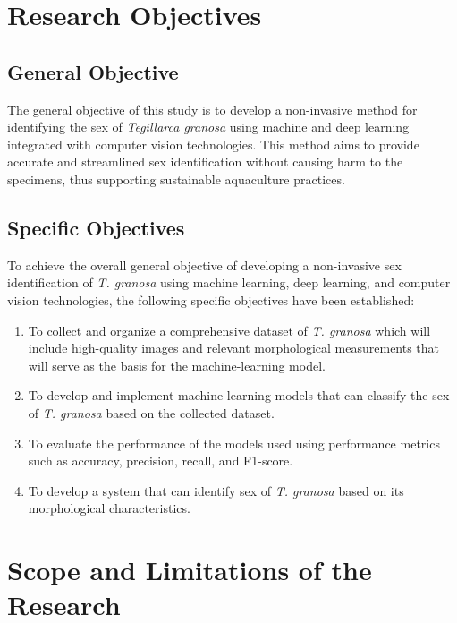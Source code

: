 \section{Research Objectives}
\label{sec:researchobjectives}

\subsection{General Objective}
\label{sec:generalobjective}

The general objective of this study is to develop a non-invasive method for identifying the sex of \textit{Tegillarca granosa} using machine and deep learning integrated with computer vision technologies. This method aims to provide accurate and streamlined sex identification without causing harm to the specimens, thus supporting sustainable aquaculture practices.

\subsection{Specific Objectives}
\label{sec:specificobjectives}

To achieve the overall general objective of developing a non-invasive sex identification of \textit{T. granosa} using machine learning, deep learning, and computer vision technologies, the following specific objectives have been established:  

\begin{enumerate}
   \item To collect and organize a comprehensive dataset of \textit{T. granosa} which will include high-quality images and relevant morphological measurements that will serve as the basis for the machine-learning model.
 
   \item To develop and implement machine learning models that can classify the sex of \textit{T. granosa} based on the collected dataset.
   
   \item To evaluate the performance of the models used using performance metrics such as accuracy, precision, recall, and F1-score. 
   
   \item To develop a system that can identify sex of \textit{T. granosa} based on its morphological characteristics. 
\end{enumerate}


\section{Scope and Limitations of the Research}
\label{sec:scopelimitations}


